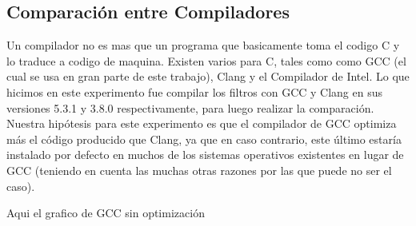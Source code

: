 \subsection{Comparación entre Compiladores}
Un compilador no es mas que un programa que basicamente toma el codigo C
y lo traduce a codigo de maquina. Existen varios para C, tales como como GCC (el cual se usa en gran parte de este trabajo), Clang y el Compilador de Intel.
Lo que hicimos en este experimento fue compilar los filtros con GCC y Clang en sus versiones 5.3.1 y 3.8.0 respectivamente, para luego realizar la comparación.
Nuestra hipótesis para este experimento es que el compilador de GCC optimiza más el código producido que Clang, ya que en caso contrario, este último estaría instalado por defecto
en muchos de los sistemas operativos existentes en lugar de GCC (teniendo en cuenta las muchas otras razones por las que puede no ser el caso).


Aqui el grafico de GCC sin optimización

\begin{figure}[H]
    \centering
    \begin{floatrow}
    \end{floatrow}
\end{figure}


